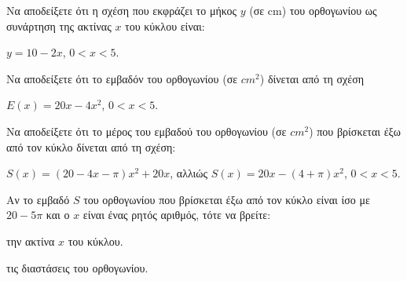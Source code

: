\begin{alist}
\item

\begin{rlist}
\item Να αποδείξετε ότι η σχέση που εκφράζει το μήκος $y$ (σε cm) του ορθογωνίου ως συνάρτηση της ακτίνας $x$ του κύκλου είναι:

$y = 10 - 2x$, $0 < x < 5$.
\item Να αποδείξετε ότι το εμβαδόν του ορθογωνίου (σε $cm^2$) δίνεται από τη σχέση

$E(x) = 20x - 4x^2$, $0 < x < 5$.
\end{rlist}
\item Να αποδείξετε ότι το μέρος του εμβαδού του ορθογωνίου (σε $cm^2$) που βρίσκεται έξω από τον κύκλο δίνεται από τη σχέση:

$S(x) = (20 - 4x - \pi)x^2 + 20x$, αλλιώς $S(x) = 20x - (4 + \pi)x^2$, $0 < x < 5$.
\item Αν το εμβαδό $S$ του ορθογωνίου που βρίσκεται έξω από τον κύκλο είναι ίσο με $20 - 5\pi$ και ο $x$ είναι ένας ρητός αριθμός, τότε να βρείτε:

\begin{rlist}
\item την ακτίνα $x$ του κύκλου.
\item τις διαστάσεις του ορθογωνίου.
\end{rlist}
\end{alist}

